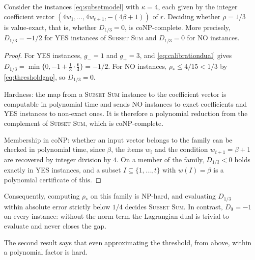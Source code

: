 \begin{theorem}\label{thm:coNP}
Consider the instances \eqref{eq:subsetmodel} with $\kappa=4$, each given
by the integer coefficient vector $(4w_1,\ldots,4w_{t+1},-(4\beta+1))$ of
$r$. Deciding whether $\rho=1/3$ is value-exact, that is, whether
$D_{1/3}=0$, is coNP-complete. More precisely, $D_{1/3}=-1/2$ for YES
instances of \textup{\textsc{Subset Sum}} and $D_{1/3}=0$ for NO instances.
\end{theorem}
\begin{proof}
For YES instances, $g_-=1$ and $g_+=3$, and \eqref{eq:calibrationdual} gives
$D_{1/3}=\min\{0,-1+\tfrac13\cdot\tfrac64\}=-1/2$. For NO instances,
$\rho_*\le4/15<1/3$ by \eqref{eq:thresholdgap}, so $D_{1/3}=0$.

Hardness: the map from a \textsc{Subset Sum} instance to the coefficient
vector is computable in polynomial time and sends NO instances to exact
coefficients and YES instances to non-exact ones. It is therefore a
polynomial reduction from the complement of \textsc{Subset Sum}, which is
coNP-complete.

Membership in coNP: whether an input vector belongs to the family can be
checked in polynomial time, since $\beta$, the items $w_i$ and the
condition $w_{t+1}=\beta+1$ are recovered by integer division by $4$. On a
member of the family, $D_{1/3}<0$ holds exactly in YES instances, and a
subset $I\subseteq\{1,\ldots,t\}$ with $w(I)=\beta$ is a polynomial
certificate of this.
\end{proof}
Consequently, computing $\rho_*$ on this family is NP-hard, and evaluating
$D_{1/3}$ within absolute error strictly below $1/4$ decides
\textsc{Subset Sum}. In contrast, $D_0=-1$ on every instance: without the
norm term the Lagrangian dual is trivial to evaluate and never closes the
gap.

The second result says that even approximating the threshold, from above,
within a polynomial factor is hard.

